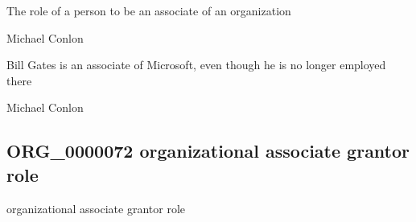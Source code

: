 \documentclass[letterpaper,10pt,english]{sphinxmanual}
\begin{document}
\begin{sphinxShadowBox}

\sphinxAtStartPar
{\hyperref[\detokenize{doc-BFO_0000023::doc}]{}}
\end{sphinxShadowBox}

\begin{sphinxShadowBox}

\sphinxAtStartPar
The role of a person to be an associate of an organization
\end{sphinxShadowBox}

\begin{sphinxShadowBox}

\sphinxAtStartPar
Michael Conlon 
\end{sphinxShadowBox}

\begin{sphinxShadowBox}

\sphinxAtStartPar
Bill Gates is an associate of Microsoft, even though he is no longer employed there
\end{sphinxShadowBox}

\begin{sphinxShadowBox}

\sphinxAtStartPar
Michael Conlon 
\end{sphinxShadowBox}
\begin{quote}

\ignorespaces \end{quote}


\subsection{ORG\_0000072 \sphinxhyphen{} organizational associate grantor role}
\label{\detokenize{doc-ORG_0000072:org-0000072-organizational-associate-grantor-role}}\label{\detokenize{doc-ORG_0000072:index-0}}\label{\detokenize{doc-ORG_0000072::doc}}
\begin{sphinxShadowBox}

\sphinxAtStartPar
organizational associate grantor role
\end{sphinxShadowBox}
\end{document}
